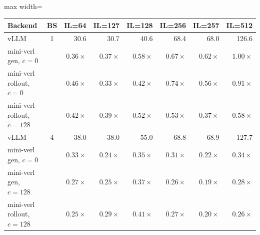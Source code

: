 %
%

\begin{table}[htbp]
    \centering
    \small
    \begin{adjustbox}{max width=\textwidth}
    \begin{tabular}{lcrrrrrr}
        \toprule
        \textbf{Backend} & \textbf{BS} &
        \textbf{IL=64} & \textbf{IL=127} & \textbf{IL=128} &
        \textbf{IL=256} & \textbf{IL=257} & \textbf{IL=512} \\
        \midrule
        vLLM                         & 1 & 30.6 & 30.7 & 40.6 & 68.4 & 68.0 & 126.6 \\
        mini-verl gen, $c{=}0$       &   & $0.36{\times}$ & $0.37{\times}$ & $0.58{\times}$ & $0.67{\times}$ & $0.62{\times}$ & $1.00{\times}$ \\
        mini-verl rollout, $c{=}0$   &   & $0.46{\times}$ & $0.33{\times}$ & $0.42{\times}$ & $0.74{\times}$ & $0.56{\times}$ & $0.91{\times}$ \\
        mini-verl rollout, $c{=}128$ &   & $0.42{\times}$ & $0.39{\times}$ & $0.52{\times}$ & $0.53{\times}$ & $0.37{\times}$ & $0.58{\times}$ \\
        \midrule
        vLLM                         & 4 & 38.0 & 38.0 & 55.0 & 68.8 & 68.9 & 127.7 \\
        mini-verl gen, $c{=}0$       &   & $0.33{\times}$ & $0.24{\times}$ & $0.35{\times}$ & $0.31{\times}$ & $0.22{\times}$ & $0.34{\times}$ \\
        mini-verl gen, $c{=}128$     &   & $0.27{\times}$ & $0.25{\times}$ & $0.37{\times}$ & $0.26{\times}$ & $0.19{\times}$ & $0.28{\times}$ \\
        mini-verl rollout, $c{=}128$ &   & $0.25{\times}$ & $0.29{\times}$ & $0.41{\times}$ & $0.27{\times}$ & $0.20{\times}$ & $0.26{\times}$ \\

\end{tabular}
\end{adjustbox}
\end{table}
